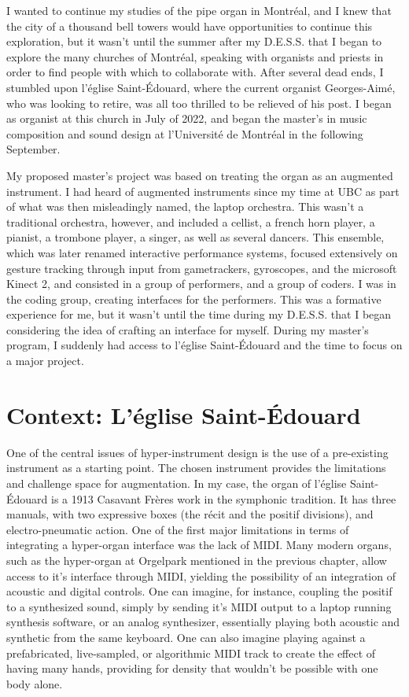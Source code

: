 \documentclass[12pt,twoside,maitrise]{dms_ks}
\theoremstyle{definition}
\begin{document}
I wanted to continue my studies of the pipe organ in Montréal, and I knew that the city of a thousand bell towers would have opportunities to continue this exploration, but it wasn’t until the summer after my D.E.S.S.
that I began to explore the many churches of Montréal, speaking with organists and priests in order to find people with which to collaborate with.
After several dead ends, I stumbled upon l’église Saint-Édouard, where the current organist Georges-Aimé, who was looking to retire, was all too thrilled to be relieved of his post.
I began as organist at this church in July of 2022, and began the master’s in music composition and sound design at l’Université de Montréal in the following September.

My proposed master’s project was based on treating the organ as an augmented instrument.
I had heard of augmented instruments since my time at UBC as part of what was then misleadingly named, the laptop orchestra.
This wasn’t a traditional orchestra, however, and included a cellist, a french horn player, a pianist, a trombone player, a singer, as well as several dancers.
This ensemble, which was later renamed interactive performance systems, focused extensively on gesture tracking through input from gametrackers, gyroscopes, and the microsoft Kinect 2, and consisted in a group of performers, and a group of coders.
I was in the coding group, creating interfaces for the performers.
This was a formative experience for me, but it wasn’t until the time during my D.E.S.S.
that I began considering the idea of crafting an interface for myself.
During my master’s program, I suddenly had access to l’église Saint-Édouard and the time to focus on a major project.

\section{Context: L'église Saint-Édouard}

One of the central issues of hyper-instrument design is the use of a pre-existing instrument as a starting point. 
The chosen instrument provides the limitations and challenge space for augmentation. 
In my case, the organ of l'église Saint-Édouard is a 1913 Casavant Frères work in the symphonic tradition. 
It has three manuals, with two expressive boxes (the récit and the positif divisions), and electro-pneumatic action. 
One of the first major limitations in terms of integrating a hyper-organ interface was the lack of MIDI. 
Many modern organs, such as the hyper-organ at Orgelpark mentioned in the previous chapter, allow access to it's interface through MIDI, yielding the possibility of an integration of acoustic and digital controls. 
One can imagine, for instance, coupling the positif to a synthesized sound, simply by sending it's MIDI output to a laptop running synthesis software, or an analog synthesizer, essentially playing both acoustic and synthetic from the same keyboard. 
One can also imagine playing against a prefabricated, live-sampled, or algorithmic MIDI track to create the effect of having many hands, providing for density that wouldn't be possible with one body alone.
\end{document}
